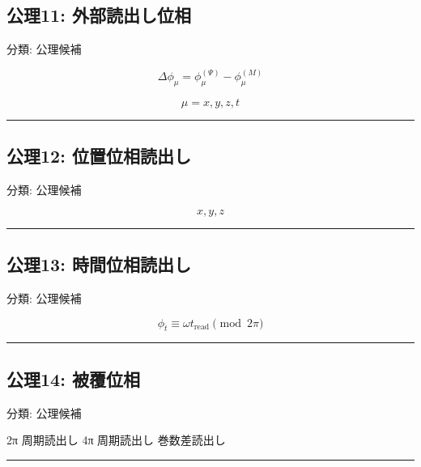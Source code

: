 \documentclass[
  a4paper,
]{ltjsarticle}
\newenvironment{Shaded}{}{}
\newcommand{\NormalTok}[1]{#1}
\begin{document}
\subsection{公理11:
外部読出し位相}\label{ux516cux740611-ux5916ux90e8ux8aadux51faux3057ux4f4dux76f8}

分類: 公理候補

\[
\Delta\phi_\mu=\phi_\mu^{(\Psi)}-\phi_\mu^{(M)}
\]

\[
\mu=x,y,z,t
\]

\begin{center}\rule{0.5\linewidth}{0.5pt}\end{center}

\subsection{公理12:
位置位相読出し}\label{ux516cux740612-ux4f4dux7f6eux4f4dux76f8ux8aadux51faux3057}

分類: 公理候補

\[
x,y,z
\]

\begin{center}\rule{0.5\linewidth}{0.5pt}\end{center}

\subsection{公理13:
時間位相読出し}\label{ux516cux740613-ux6642ux9593ux4f4dux76f8ux8aadux51faux3057}

分類: 公理候補

\[
\phi_t\equiv\omega t_{\mathrm{read}}\pmod{2\pi}
\]

\begin{center}\rule{0.5\linewidth}{0.5pt}\end{center}

\subsection{公理14:
被覆位相}\label{ux516cux740614-ux88abux8986ux4f4dux76f8}

分類: 公理候補

\begin{Shaded}
\begin{Highlighting}[]
\NormalTok{2π 周期読出し}
\NormalTok{4π 周期読出し}
\NormalTok{巻数差読出し}
\end{Highlighting}
\end{Shaded}

\begin{center}\rule{0.5\linewidth}{0.5pt}\end{center}
\end{document}
